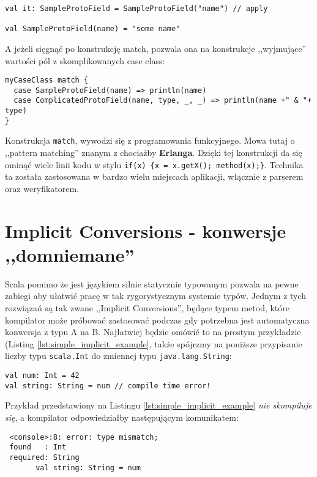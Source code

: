 \begin{lstlisting}
val it: SampleProtoField = SampleProtoField("name") // apply

val SampleProtoField(name) = "some name"
\end{lstlisting}

A jeżeli sięgnąć po konstrukcję match, pozwala ona na konstrukcje ,,wyjmujące'' wartości pól z skomplikowanych case class:

\begin{lstlisting}
myCaseClass match {
  case SampleProtoField(name) => println(name)
  case ComplicatedProtoField(name, type, _, _) => println(name +" & "+ type)
}
\end{lstlisting}

Konstrukcja \verb|match|, wywodzi się z programowania funkcyjnego. Mowa tutaj o ,,pattern matching''
znanym z chociażby \textbf{Erlanga}. Dzięki tej konstrukcji da się ominąć wiele linii kodu w stylu \verb|if(x) {x = x.getX(); method(x);}|.
Technika ta została zastosowana w bardzo wielu miejscach aplikacji, włącznie z parserem oraz weryfikatorem.


\section{Implicit Conversions - konwersje ,,domniemane''}
\label{sec:implicit}
Scala pomimo że jest językiem silnie statycznie typowanym pozwala na pewne zabiegi aby ułatwić pracę w tak rygorystycznym systemie typów.
Jednym z tych rozwiązań są tak zwane ,,Implicit Conversions'', będące typem metod, które kompilator może próbować zastosować podczas gdy 
potrzebna jest automatyczna konwersja z typu A na B. Najłatwiej będzie omówić to na prostym przykładzie (Listing \ref{lst:simple_implicit_example},
także spójrzmy na poniższe przypisanie liczby typu \verb|scala.Int| do zmiennej typu \verb|java.lang.String|:

\begin{lstlisting}[caption={Przykład wystąpienia implicit conversion}, label={lst:simple_implicit_example}]
val num: Int = 42
val string: String = num // compile time error!
\end{lstlisting}

Przykład przedstawiony na Listingu \ref{lst:simple_implicit_example} \textit{nie skompiluje się}, a kompilator odpowiedziałby następującym komunikatem:

\begin{verbatim}
 <console>:8: error: type mismatch;
 found   : Int
 required: String
       val string: String = num
\end{verbatim}

